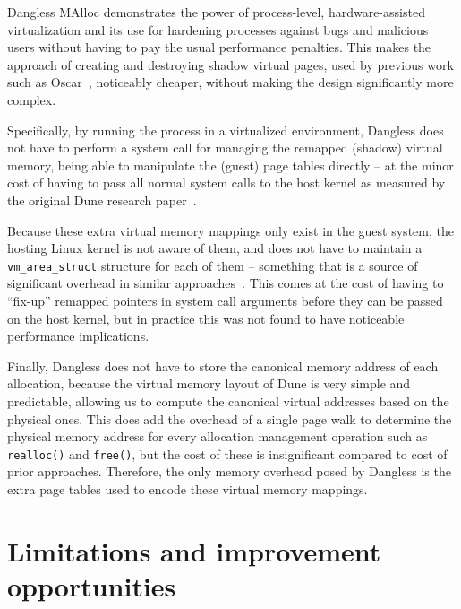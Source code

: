 
Dangless MAlloc demonstrates the power of process-level, hardware-assisted virtualization and its use for hardening processes against bugs and malicious users without having to pay the usual performance penalties. This makes the approach of creating and destroying shadow virtual pages, used by previous work such as Oscar~\cite{oscar2017}, noticeably cheaper, without making the design significantly more complex.


Specifically, by running the process in a virtualized environment, Dangless does not have to perform a system call for managing the remapped (shadow) virtual memory, being able to manipulate the (guest) page tables directly -- at the minor cost of having to pass all normal system calls to the host kernel as measured by the original Dune research paper~\cite{dune-paper}.

Because these extra virtual memory mappings only exist in the guest system, the hosting Linux kernel is not aware of them, and does not have to maintain a \lstinline!vm_area_struct! structure for each of them -- something that is a source of significant overhead in similar approaches~\cite{oscar2017}. This comes at the cost of having to ``fix-up'' remapped pointers in system call arguments before they can be passed on the host kernel, but in practice this was not found to have noticeable performance implications.

Finally, Dangless does not have to store the canonical memory address of each allocation, because the virtual memory layout of Dune is very simple and predictable, allowing us to compute the canonical virtual addresses based on the physical ones. This does add the overhead of a single page walk to determine the physical memory address for every allocation management operation such as \lstinline!realloc()! and \lstinline!free()!, but the cost of these is insignificant compared to cost of prior approaches. Therefore, the only memory overhead posed by Dangless is the extra page tables used to encode these virtual memory mappings.

\section{Limitations and improvement opportunities}

